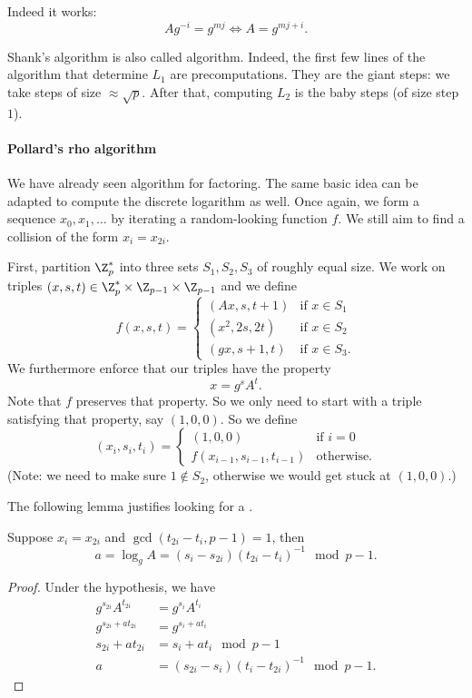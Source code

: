 \documentclass[a4paper, 11pt, openany]{book}
\begin{document}
Indeed it works:
\[
    Ag^{-i} = g^{mj} \iff A = g^{mj + i}.
\]


Shank's algorithm is also called  algorithm. Indeed, the first few lines of the algorithm that determine $L_1$ are precomputations. They are the giant steps: we take steps of size $\approx \sqrt{p}$. After that, computing $L_2$ is the baby steps (of size step $1$).

\paragraph{Pollard's rho algorithm}

We have already seen  algorithm for factoring. The same basic idea can be adapted to compute the discrete logarithm as well. Once again, we form a sequence $x_0, x_1, \dots$ by iterating a random-looking function $f$. We still aim to find a collision of the form $x_i = x_{2i}$.

First, partition $\Z_p^*$ into three sets $S_1, S_2, S_3$ of roughly equal size. We work on triples $(x,s,t) \in \Z_p^* \times \Z_{p-1} \times \Z_{p-1}$ and we define
\[
    f(x, s, t) = \begin{cases}
    (Ax, s, t+1)    &\text{if } x \in S_1\\
    (x^2, 2s, 2t)   &\text{if } x \in S_2\\
    (gx, s+1, t)    &\text{if } x \in S_3.
    \end{cases}
\]
We furthermore enforce that our triples have the property
\[
    x = g^s A^t.
\]
Note that $f$ preserves that property. So we only need to start with a triple satisfying that property, say $(1,0,0)$. So we define
\[
    (x_i, s_i, t_i) = \begin{cases}
    (1,0,0) &\text{if } i=0\\
    f(x_{i-1}, s_{i-1} , t_{i-1}) &\text{otherwise.}
    \end{cases}
\]
(Note: we need to make sure $1 \notin S_2$, otherwise we would get stuck at $(1,0,0)$.)

The following lemma justifies looking for a .

\begin{lemma}
Suppose $x_i = x_{2i}$ and $\gcd(t_{2i} - t_i, p-1) = 1$, then
\[
    a = \log_g A = (s_i - s_{2i})(t_{2i}- t_i)^{-1} \mod p-1.
\]
\end{lemma}

\begin{proof}
Under the hypothesis, we have
\begin{align*}
    g^{s_{2i}} A^{t_{2i}} &= g^{s_i} A^{t_i}\\
    g^{s_{2i} + at_{2i} } &= g^{ s_i + at_i }\\
    s_{2i} + at_{2i}  &=  s_i + at_i \mod p-1\\
    a &= (s_{2i} - s_i)(t_i - t_{2i})^{-1} \mod p-1.
\end{align*}
\end{proof}
\end{document}
